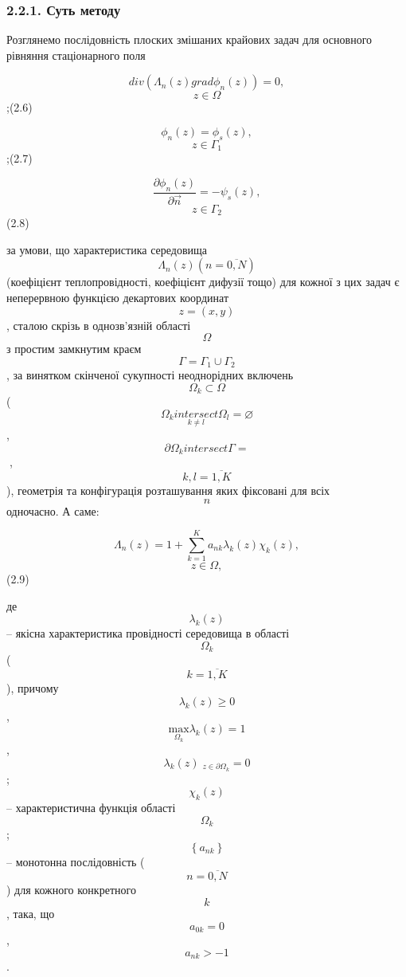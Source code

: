 \hypertarget{ux441ux443ux442ux44c-ux43cux435ux442ux43eux434ux443}{%
\subsubsection[2.2.1. Суть
методу]{\texorpdfstring{\protect\hypertarget{anchor-31}{}{}2.2.1. Суть
методу}{2.2.1. Суть методу}}\label{ux441ux443ux442ux44c-ux43cux435ux442ux43eux434ux443}}

Розглянемо послідовність плоских змішаних крайових задач для основного
рівняння стаціонарного поля

\[{\mathit{\text{div}}{\left( {\Lambda_{n}\left( z \right)\mathit{\text{grad}}\phi_{n}\left( z \right)} \right) = 0},}{}\]
\[{z\in\Omega}{}\];(2.6)

\[{\phi_{n}{\left( z \right) = \phi_{s}}\left( z \right),}{}\]
\[{z\in\Gamma_{1}}{}\];(2.7)

\[{{\frac{\partial\phi_{n}\left( z \right)}{\partial\overrightarrow{n}} = {- \psi_{s}}}\left( z \right),}{}\]
\[{z\in\Gamma_{2}}{}\](2.8)

за умови, що характеристика середовища
\[{\Lambda_{n}(z)({n = \overline{0,N}})}{}\] (коефіцієнт
теплопровідності, коефіцієнт дифузії тощо) для кожної з цих задач є
неперервною функцією декартових координат
\[{z = \left( {x,y} \right)}{}\], сталою скрізь в однозв'язній області
\[\Omega{}\] з простим замкнутим краєм
\[{\Gamma = {\Gamma_{1} \cup \Gamma_{2}}}{}\], за винятком скінченої
сукупності неоднорідних включень \[{\Omega_{k}\subset\Omega}{}\]
(\[{\Omega_{k}\underset{k \neq l}{\mathit{intersect}}{\Omega_{l} = \varnothing}}{}\],
\[{\partial\Omega_{k}\mathit{intersect}{\Gamma =}}{}\],
\[{k,{l = \overline{1,K}}}{}\]), геометрія та конфігурація розташування
яких фіксовані для всіх \[n{}\]одночасно. А саме:

\[{\Lambda_{n}{\left( z \right) = {1 + {\sum\limits_{k = 1}^{K}{a_{\mathit{\text{nk}}}\lambda_{k}\left( z \right)\chi_{k}\left( z \right)}}}},}{}\]
\[{z\in\Omega,}{}\](2.9)

де \[{\lambda_{k}\left( z \right)}{}\] -- якісна характеристика
провідності середовища в області \[\Omega_{k}{}\]
(\[{k = \overline{1,K}}{}\]), причому
\[{\lambda_{k}{\left( z \right) \geq 0}}{}\],
\[{\underset{\Omega_{k}}{\text{max}}\lambda_{k}\left( z \right){= 1}}{}\],
\[{\lambda_{k}\left( z \right){_{z\in\partial\Omega_{k}} = 0}}{}\];
\[{\chi_{k}\left( z \right)}{}\] -- характеристична функція області
\[\Omega_{k}{}\]; \[\left\{ a_{\mathit{\text{nk}}} \right\}{}\] --
монотонна послідовність (\[{n = \overline{0,N}}{}\]) для кожного
конкретного \[k{}\], така, що \[{a_{0k} = 0}{}\],
\[{a_{\mathit{\text{nk}}} > {- 1}}{}\].

